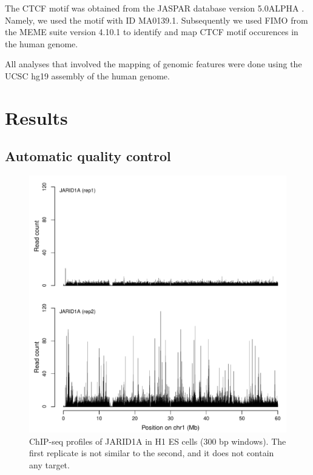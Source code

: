 \documentclass{bioinfo}
\begin{document}
\begin{methods}
The CTCF motif was obtained from the JASPAR database version
5.0{\textunderscore}ALPHA \citep{pmid24194598}. Namely, we used the motif
with ID MA0139.1.
Subsequently we used FIMO \citep{pmid21330290} from the MEME suite version
4.10.1 \citep{pmid19458158} to identify and map CTCF motif occurences in the
human genome.

All analyses that involved the mapping of genomic features were done using the
UCSC hg19 assembly of the human genome.

\end{methods}

\section{Results}
\label{sec:results}

\subsection{Automatic quality control}

\begin{figure}[!tpb]
\centerline{\includegraphics[scale=0.5]{jarid.pdf}}
\caption{
  ChIP-seq profiles of JARID1A in H1 ES cells (300 bp windows).
  The first replicate is not similar to the second, and it does not
  contain any target.
}\label{fig:jarid}
\end{figure}
\end{document}
